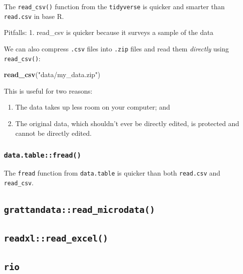 \documentclass[]{book}
\newenvironment{Shaded}{\begin{snugshade}}{\end{snugshade}}
\newcommand{\KeywordTok}[1]{\textcolor[rgb]{0.13,0.29,0.53}{\textbf{#1}}}
\newcommand{\NormalTok}[1]{#1}
\newcommand{\StringTok}[1]{\textcolor[rgb]{0.31,0.60,0.02}{#1}}
\providecommand{\tightlist}{%
  \setlength{\itemsep}{0pt}\setlength{\parskip}{0pt}}
\begin{document}
The \texttt{read\_csv()} function from the \texttt{tidyverse} is quicker and smarter than \texttt{read.csv} in base R.

Pitfalls:
1. read\_csv is quicker because it surveys a sample of the data

We can also compress \texttt{.csv} files into \texttt{.zip} files and read them \emph{directly} using \texttt{read\_csv()}:

\begin{Shaded}
\begin{Highlighting}[]
\KeywordTok{read_csv}\NormalTok{(}\StringTok{"data/my_data.zip"}\NormalTok{)}
\end{Highlighting}
\end{Shaded}

This is useful for two reasons:

\begin{enumerate}
\def\labelenumi{\arabic{enumi}.}
\tightlist
\item
  The data takes up less room on your computer; and
\item
  The original data, which shouldn't ever be directly edited, is protected and cannot be directly edited.
\end{enumerate}

\hypertarget{data.tablefread}{%
\subsubsection{\texorpdfstring{\texttt{data.table::fread()}}{data.table::fread()}}\label{data.tablefread}}

The \texttt{fread} function from \texttt{data.table} is quicker than both \texttt{read.csv} and \texttt{read\_csv}.

\hypertarget{read_microdata}{%
\subsection{\texorpdfstring{\texttt{grattandata::read\_microdata()}}{grattandata::read\_microdata()}}\label{read_microdata}}

\hypertarget{readxlread_excel}{%
\subsection{\texorpdfstring{\texttt{readxl::read\_excel()}}{readxl::read\_excel()}}\label{readxlread_excel}}

\hypertarget{rio}{%
\subsection{\texorpdfstring{\texttt{rio}}{rio}}\label{rio}}
\end{document}
